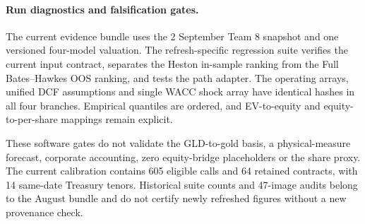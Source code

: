 \paragraph{Run diagnostics and falsification gates.}

The current evidence bundle uses the 2 September Team 8 snapshot and one
versioned four-model valuation. The refresh-specific regression suite verifies
the current input contract, separates the Heston in-sample ranking from the
Full Bates--Hawkes OOS ranking, and tests the path adapter. The operating
arrays, unified DCF assumptions and single WACC shock array have identical
hashes in all four branches. Empirical quantiles are ordered, and EV-to-equity
and equity-to-per-share mappings remain explicit.

These software gates do not validate the GLD-to-gold basis, a physical-measure
forecast, corporate accounting, zero equity-bridge placeholders or the share
proxy. The current calibration contains 605 eligible calls and 64 retained
contracts, with 14 same-date Treasury tenors. Historical suite counts and
47-image audits belong to the August bundle and do not certify newly refreshed
figures without a new provenance check.
